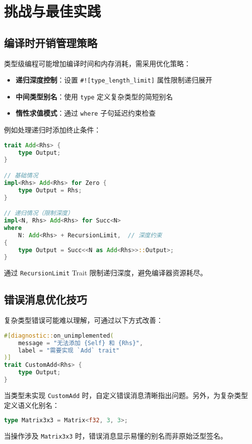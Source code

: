 \chapter{挑战与最佳实践}
\section{编译时开销管理策略}
类型级编程可能增加编译时间和内存消耗，需采用优化策略：\par
\begin{itemize}
\item \textbf{递归深度控制}：设置 \texttt{\#{}![type\_{}length\_{}limit]} 属性限制递归展开
\item \textbf{中间类型别名}：使用 \texttt{type} 定义复杂类型的简短别名
\item \textbf{惰性求值模式}：通过 \texttt{where} 子句延迟约束检查
\end{itemize}
例如处理递归时添加终止条件：\par
\begin{lstlisting}[language=rust]
trait Add<Rhs> {
    type Output;
}

// 基础情况
impl<Rhs> Add<Rhs> for Zero {
    type Output = Rhs;
}

// 递归情况（限制深度）
impl<N, Rhs> Add<Rhs> for Succ<N> 
where
    N: Add<Rhs> + RecursionLimit,  // 深度约束
{
    type Output = Succ<<N as Add<Rhs>>::Output>;
}
\end{lstlisting}
通过 \texttt{RecursionLimit} Trait 限制递归深度，避免编译器资源耗尽。\par
\section{错误消息优化技巧}
复杂类型错误可能难以理解，可通过以下方式改善：\par
\begin{lstlisting}[language=rust]
#[diagnostic::on_unimplemented(
    message = "无法添加 {Self} 和 {Rhs}",
    label = "需要实现 `Add` trait"
)]
trait CustomAdd<Rhs> {
    type Output;
}
\end{lstlisting}
当类型未实现 \texttt{CustomAdd} 时，自定义错误消息清晰指出问题。另外，为复杂类型定义语义化别名：\par
\begin{lstlisting}[language=rust]
type Matrix3x3 = Matrix<f32, 3, 3>;
\end{lstlisting}
当操作涉及 \texttt{Matrix3x3} 时，错误消息显示易懂的别名而非原始泛型签名。\par
